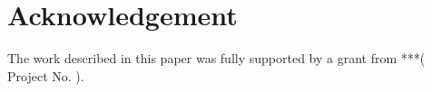 \documentclass{elsarticle}
\begin{document}
\section{Acknowledgement}
\label{sec:acknowledgement}

The work described in this paper was fully supported by a grant from ***( Project No.  ). 





\end{document}
